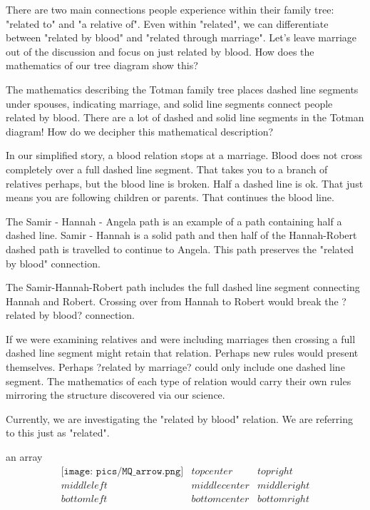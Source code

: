 \documentclass{ximera}
\begin{document}
There are two main connections people experience within their family tree: "related to" and "a relative of". Even within "related", we can differentiate between "related by blood" and "related through marriage". Let's leave marriage out of the discussion and focus on just related by blood.  How does the mathematics of our tree diagram show this?

The mathematics describing the Totman family tree places dashed line segments under spouses, indicating marriage, and solid line segments connect people related by blood. There are a lot of dashed and solid line segments in the Totman diagram!  How do we decipher this mathematical description?

In our simplified story, a blood relation stops at a marriage.  Blood does not cross completely over a full dashed line segment. That takes you to a branch of relatives perhaps, but the blood line is broken.  Half a dashed line is ok.  That just means you are following children or parents.  That continues the blood line.

The Samir - Hannah - Angela path is an example of a path containing half a dashed line. Samir - Hannah is a solid path and then half of the Hannah-Robert dashed path is travelled to continue to Angela.  This path preserves the "related by blood" connection.

The Samir-Hannah-Robert path includes the full dashed line segment connecting Hannah and Robert.  Crossing over from Hannah to Robert would break the ?related by blood? connection.

If we were examining relatives and were including marriages then crossing a full dashed line segment might retain that relation. Perhaps new rules would present themselves. Perhaps ?related by marriage? could only include one dashed line segment.  The mathematics of each type of relation would carry their own rules mirroring the structure discovered via our science.

Currently, we are investigating the "related by blood" relation. We are referring to this just as "related".


an array
\[
\begin{array}{ccc}
\texttt{[image: pics/MQ\_arrow.png]} & top center & top right \\
middle left & middle center & middle right \\
bottom left & bottom center & bottom right 
\end{array}
\]
\end{document}
